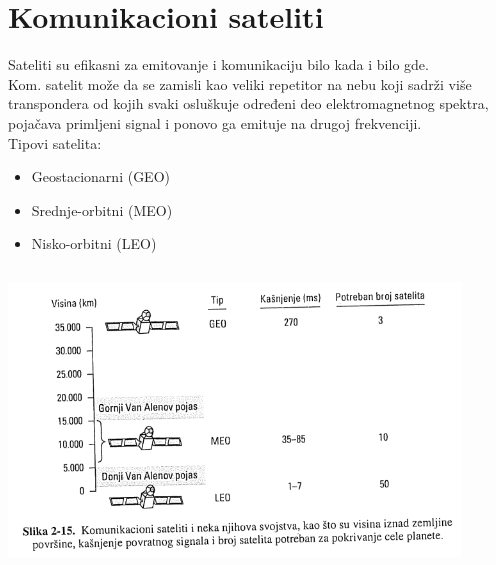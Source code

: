 \documentclass{article} %
\begin{document}
\section{Komunikacioni sateliti}
Sateliti su efikasni za emitovanje i komunikaciju bilo kada i bilo gde. \\
Kom. satelit može da se zamisli kao veliki repetitor na nebu koji sadrži više transpondera od kojih svaki osluškuje određeni deo elektromagnetnog spektra, pojačava primljeni signal i ponovo ga emituje na drugoj frekvenciji. \\
Tipovi satelita:
\begin{itemize}
  \item Geostacionarni (GEO)
  \item Srednje-orbitni (MEO)
  \item Nisko-orbitni (LEO)
\end{itemize}
\begin{center}
\includegraphics[width=12cm, height=8cm]{sateliti}\\
\end{center}
\end{document}
